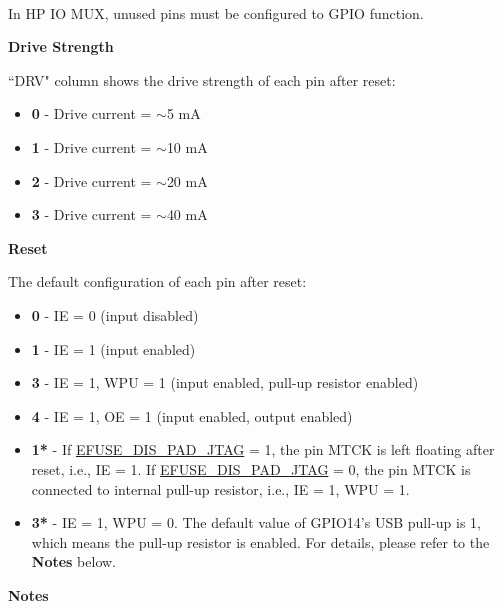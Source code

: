 \documentclass[main\_\_EN.tex]{subfiles}
\begin{document}
\begin{importantlisting}\\
In HP IO MUX, unused pins must be configured to GPIO function.
\end{importantlisting}

\textbf{Drive Strength}

``DRV" column shows the drive strength of each pin after reset:

\begin{itemize}
\item \textbf{0} - Drive current = $\sim$5 mA
\item \textbf{1} - Drive current = $\sim$10 mA
\item \textbf{2} - Drive current = $\sim$20 mA
\item \textbf{3} - Drive current = $\sim$40 mA
\end{itemize}

    \textbf{Reset}

    The default configuration of each pin after reset:

\begin{itemize}
\item \textbf{0} - IE = 0 (input disabled)
\item \textbf{1} - IE = 1 (input enabled)
\item \textbf{3} - IE = 1, WPU = 1 (input enabled, pull-up resistor enabled)
\item \textbf{4} - IE = 1, OE = 1 (input enabled, output enabled)
\item \textbf{1*} - If \hyperref[fielddesc:EFUSEDISPADJTAG]{EFUSE\_DIS\_PAD\_JTAG} = 1, the pin MTCK is left floating after reset, i.e., IE = 1. If \hyperref[fielddesc:EFUSEDISPADJTAG]{EFUSE\_DIS\_PAD\_JTAG} = 0, the pin MTCK is connected to internal pull-up resistor, i.e., IE = 1, WPU = 1.
\item \textbf{3*} - IE = 1, WPU = 0. The default value of GPIO14's USB pull-up is 1, which means the pull-up resistor is enabled. For details, please refer to the \textbf{Notes} below.
\end{itemize}
   
    \textbf{Notes}
\end{document}
